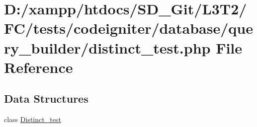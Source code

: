\hypertarget{tests_2codeigniter_2database_2query__builder_2distinct__test_8php}{}\section{D\+:/xampp/htdocs/\+S\+D\+\_\+\+Git/\+L3\+T2/\+F\+C/tests/codeigniter/database/query\+\_\+builder/distinct\+\_\+test.php File Reference}
\label{tests_2codeigniter_2database_2query__builder_2distinct__test_8php}
\subsection*{Data Structures}
\begin{DoxyCompactItemize}
\item 
class \hyperlink{class_distinct__test}{Distinct\+\_\+test}
\end{DoxyCompactItemize}
